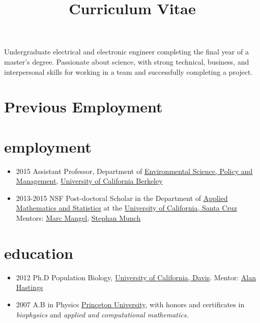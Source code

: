 \documentclass[11pt,a4paper,sans]{moderncv}        %
\title{Curriculum Vitae}                               %
\begin{document}
\makecvtitle

\small{Undergraduate electrical and electronic engineer completing the final year of a master's degree. Passionate about science, with strong technical, business, and interpersonal skills for working in a team and successfully completing a project.}

\section{Previous Employment}

\section{employment}\label{employment}

\begin{itemize}
\item
  2015 Assistant Professor, Department of
  \href{http://ourenvironment.berkeley.edu}{Environmental Science,
  Policy and Management}, \href{http://www.berkeley.edu}{University of
  California Berkeley}
\item
  2013-2015 NSF Post-doctoral Scholar in the Department of
  \href{https://www.soe.ucsc.edu/departments/applied-mathematics-statistics}{Applied
  Mathematics and Statistics} at the
  \href{http://www.ucsc.edu}{University of California, Santa Cruz}
  Mentors: \href{http://users.soe.ucsc.edu/~msmangel/}{Marc Mangel},
  \href{http://swfsc.noaa.gov/staff.aspx?\&id=17294}{Stephan Munch}
\end{itemize}

\section{education}\label{education}

\begin{itemize}
\item
  2012 Ph.D Population Biology, \href{http://ucdavis.edu}{University of
  California, Davis}. Mentor: \href{http://two.ucdavis.edu/~me}{Alan
  Hastings}
\item
  2007 A.B in Physics \href{http://princeton.edu}{Princeton University},
  with honors and certificates in \emph{biophysics} and \emph{applied
  and computational mathematics.}
\end{itemize}
\end{document}
